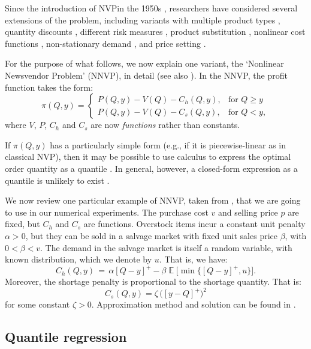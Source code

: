 \documentclass{article}
\DeclareMathOperator{\E}{\mathbb{E}}
\begin{document}
Since the introduction of NVPin the 1950s \cite{AHM51,MK51}, researchers have considered several extensions of the problem, including variants with multiple product types \cite{HW63,LL96,MS00}, quantity discounts \cite{Kh95}, different risk measures \cite{EGS95}, product substitution \cite{BAA99}, nonlinear cost functions \cite{HOS12}, non-stationary demand \cite{KWH15}, and price setting \cite{KC62,Mi59,PD99}.

For the purpose of what follows, we now explain one variant, the `Nonlinear Newsvendor Problem' (NNVP), in detail (see also \cite{BT06,HOS12,HN16,KC62,Kh95,KK18,Mi59,PSC15,PD99}). In the NNVP, the profit function takes the form:
\[
    \pi(Q,y)=
    \begin{cases}
        P(Q,y)-V(Q)-C_h(Q,y),& \text{for } Q \geq y\\
        P(Q,y)-V(Q)-C_s(Q,y),& \text{for } Q< y,
    \end{cases}
\]
where $V$, $P$, $C_h$ and $C_s$ are now \emph{functions} rather than constants.

If $\pi(Q,y)$ has a particularly simple form (e.g., if it is piecewise-linear as in classical NVP), then it may be possible to  use calculus to express the optimal order quantity as a quantile \cite{Ch12}. In general, however, a closed-form expression as a quantile is unlikely to exist \cite{HOS12,Por02}.

We now review one particular example of NNVP, taken from \cite{KK18,PD99,RK02}, that we are going to use in our numerical experiments. The purchase cost $v$ and selling price $p$ are fixed, but $C_h$ and $C_s$ are functions. Overstock items incur a constant unit penalty $\alpha > 0$, but they can be sold in a salvage market with fixed unit sales price $\beta$, with $0<\beta<v$. The demand in the salvage market is itself a random variable, with known distribution, which we denote by $u$. That is, we have:
\[
    C_h(Q,y) \, = \, \alpha[Q-y]^{+} - \beta \E \Big[ \min \big\{ [Q-y]^{+},u \big\} \Big].
\]
Moreover, the shortage penalty is proportional to the shortage quantity. That is:
\[
C_s(Q,y) =  \zeta \, \big( [y-Q]^{+} \big)^2
\]
for some constant $\zeta > 0$. Approximation method and solution can be found in \cite{KK18}.

\subsection{Quantile regression} \label{sub:lit3}
\end{document}
